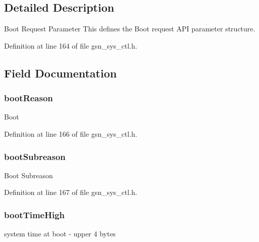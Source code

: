 \subsection{Detailed Description}
Boot Request Parameter This defines the Boot request API parameter structure. 

Definition at line 164 of file gsn\_\-sys\_\-ctl.h.



\subsection{Field Documentation}
\hypertarget{a00247_a790d16551427558514773e316e68adc8}{
\subsubsection[{bootReason}]{ {\bf bootReason}}}
\label{a00247_a790d16551427558514773e316e68adc8}
Boot 

Definition at line 166 of file gsn\_\-sys\_\-ctl.h.

\hypertarget{a00247_afd8f781bf6ef91de8ce1bdcf53047bb4}{
\subsubsection[{bootSubreason}]{ {\bf bootSubreason}}}
\label{a00247_afd8f781bf6ef91de8ce1bdcf53047bb4}
Boot Subreason 

Definition at line 167 of file gsn\_\-sys\_\-ctl.h.

\hypertarget{a00247_ab360fb81514af95b2c567b11bc326d72}{
\subsubsection[{bootTimeHigh}]{ {\bf bootTimeHigh}}}
\label{a00247_ab360fb81514af95b2c567b11bc326d72}
system time at boot -\/ upper 4 bytes 

